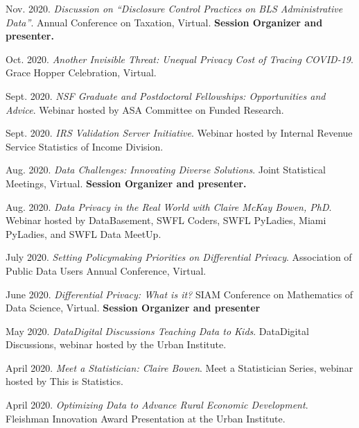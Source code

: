 \documentclass[11pt, letterpaper, roman]{moderncv} %
\begin{document}
\begin{etaremune}[topsep=0pt, itemsep=5pt, partopsep=0pt, parsep=0pt]
    \item Nov. 2020. \textit{Discussion on ``Disclosure Control Practices on BLS Administrative Data''}. Annual Conference on Taxation, Virtual. \textbf{Session Organizer and presenter.}
    
    \item Oct. 2020. \textit{Another Invisible Threat: Unequal Privacy Cost of Tracing COVID-19}. Grace Hopper Celebration, Virtual.
    
    \item Sept. 2020. \textit{NSF Graduate and Postdoctoral Fellowships: Opportunities and Advice}. Webinar hosted by ASA Committee on Funded Research.
    
    \item Sept. 2020. \textit{IRS Validation Server Initiative}. Webinar hosted by Internal Revenue Service Statistics of Income Division.
    
    \item Aug. 2020. \textit{Data Challenges: Innovating Diverse Solutions}. Joint Statistical Meetings, Virtual. \textbf{Session Organizer and presenter.}
    
    \item Aug. 2020. \textit{Data Privacy in the Real World with Claire McKay Bowen, PhD}. Webinar hosted by DataBasement, SWFL Coders, SWFL PyLadies, Miami PyLadies, and SWFL Data MeetUp.
    
    \item July 2020. \textit{Setting Policymaking Priorities on Differential Privacy}. Association of Public Data Users Annual Conference, Virtual.
    
    \item June 2020. \textit{Differential Privacy: What is it?} SIAM Conference on Mathematics of Data Science, Virtual. \textbf{Session Organizer and presenter}
    
    \item May 2020. \textit{Data\@Urban Digital Discussions Teaching Data to Kids}. Data\@Urban Digital Discussions, webinar hosted by the Urban Institute.
    
    \item April 2020. \textit{Meet a Statistician: Claire Bowen}. Meet a Statistician Series, webinar hosted by This is Statistics.
    
    \item April 2020. \textit{Optimizing Data to Advance Rural Economic Development}. Fleishman Innovation Award Presentation at the Urban Institute.
    

\end{etaremune}
\end{document}
